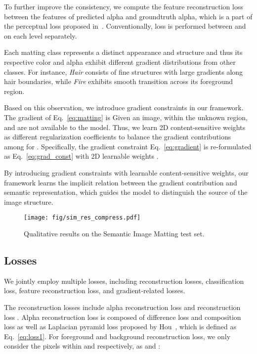 \documentclass[10pt,twocolumn,letterpaper]{article}
\newcommand\cspace{15}
\begin{document}
To further improve the consistency, we  compute the feature reconstruction loss between the features of predicted alpha and groundtruth alpha, which is a part of the perceptual loss proposed in~\cite{johnson2016perceptual}. Conventionally,  loss is performed between  and  on each level separately.

\vspace {4pt}
 Each matting class represents a distinct appearance and structure and thus its respective color and alpha exhibit different gradient distributions from other classes. For instance, {\em Hair} consists of fine structures with large gradients along  hair boundaries, while {\em Fire} exhibits smooth transition across its foreground region. 

Based on this observation, we introduce gradient constraints in our framework. The gradient of Eq.~\ref{eq:matting} is 
Given an image, within the unknown region,  and  are not available to the model. Thus, we learn 2D content-sensitive weights as different regularization coefficients to balance the gradient contributions among  for . Specifically, the gradient constraint Eq.~\ref{eq:gradient} is re-formulated as Eq.~\ref{eq:grad_const} with 2D learnable weights . 

By introducing gradient constraints with learnable content-sensitive weights, our framework learns the implicit relation between the gradient contribution and semantic representation, which guides the model to distinguish the source of the image structure. 

\begin{figure*}[ht]
\centering 
\texttt{[image: fig/sim\_res\_compress.pdf]} 
\caption{Qualitative results on the Semantic Image Matting test set.}
\label{fig:sim_res}
\vspace{-\cspace pt}
\end{figure*}

\subsection{Losses}
We jointly employ multiple losses, including reconstruction losses, classification loss, feature reconstruction loss, and gradient-related losses.

\vspace {4pt}
 The reconstruction losses include alpha reconstruction loss  and  reconstruction loss . Alpha reconstruction loss is composed of difference loss and composition loss as well as Laplacian pyramid loss  proposed by Hou~\etal\cite{hou2019context}, which is defined as Eq.~\ref{eq:loss1}. For foreground and background reconstruction loss, we only consider the pixels within  and  respectively, as  and :
\end{document}
